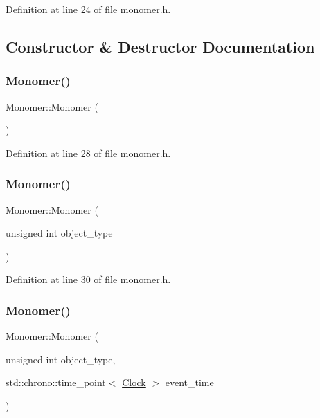 Definition at line 24 of file monomer.\+h.



\subsection{Constructor \& Destructor Documentation}
\mbox{\label{class_monomer_a2b1f69caca47d8597e43300ae7076095}} 
\subsubsection{\texorpdfstring{Monomer()}{Monomer()}\hspace{0.1cm}{\footnotesize\ttfamily [1/4]}}
{\footnotesize\ttfamily Monomer\+::\+Monomer (\begin{DoxyParamCaption}{ }\end{DoxyParamCaption})\hspace{0.3cm}{\ttfamily [inline]}}



Definition at line 28 of file monomer.\+h.

\mbox{\label{class_monomer_af2249bf76132ee3802eaccb49b76fb96}} 
\subsubsection{\texorpdfstring{Monomer()}{Monomer()}\hspace{0.1cm}{\footnotesize\ttfamily [2/4]}}
{\footnotesize\ttfamily Monomer\+::\+Monomer (\begin{DoxyParamCaption}\item[{unsigned int}]{object\+\_\+type }\end{DoxyParamCaption})\hspace{0.3cm}{\ttfamily [inline]}}



Definition at line 30 of file monomer.\+h.

\mbox{\label{class_monomer_acab23e1c41e236417492da5c1e617b1a}} 
\subsubsection{\texorpdfstring{Monomer()}{Monomer()}\hspace{0.1cm}{\footnotesize\ttfamily [3/4]}}
{\footnotesize\ttfamily Monomer\+::\+Monomer (\begin{DoxyParamCaption}\item[{unsigned int}]{object\+\_\+type,  }\item[{std\+::chrono\+::time\+\_\+point$<$ \hyperlink{universe_8h_a0ef8d951d1ca5ab3cfaf7ab4c7a6fd80}{Clock} $>$}]{event\+\_\+time }\end{DoxyParamCaption})\hspace{0.3cm}{\ttfamily [inline]}}



